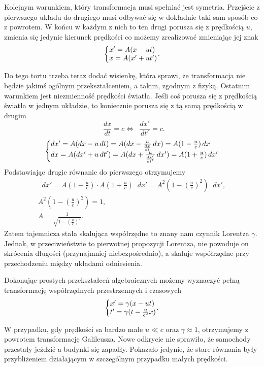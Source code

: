 \documentclass[10pt,twocolumn,fleqn,polish]{article}
\makeatletter
\newcommand{\diff}{\mathop{}\!{d}}
\newcommand{\derivative}[2][]{\mathop{}\!\frac{{d}#1}{{d}#2}}
\newenvironment{eqsystem}
  {\left\lbrace
    \begin{array}{@{}l@{}}}
  {\end{array}\right.}
\makeatother
\begin{document}
Kolejnym warunkiem, który transformacja musi spełniać jest symetria.
Przejście z pierwszego układu do drugiego musi odbywać się w dokładnie taki
sam sposób co z powrotem. W końcu w każdym z nich to ten drugi porusza się
z prędkością $u$, zmienia się jedynie kierunek prędkości co możemy zrealizować
zmieniając jej znak
\[
  \begin{eqsystem}
    x' = A (x - ut) \\
    x = A (x' + ut')
  \end{eqsystem}.
\]

Do tego tortu trzeba teraz dodać wisienkę, która sprawi, że transformacja
nie będzie jakimś ogólnym przekształceniem, a takim, zgodnym z fizyką.
Ostatnim warunkiem jest niezmienność prędkości światła.
Jeśli coś porusza się z prędkością światła w jednym układzie, to koniecznie porusza się
z tą samą prędkością w drugim
\[\derivative[x]{t} = c \iff \derivative[x']{t'} = c.\]
\[
  \begin{eqsystem}
    \diff x' = A (\diff x - u \diff t)
    = A(\diff x - \frac{u}{\derivative[x]{t}} \diff x)
    = A(1 - \frac{u}{c}) \diff x \\
    \diff x = A(\diff x' + u \diff t')
    = A(\diff x + \frac{u}{\derivative[x']{t'}} \diff x')
    = A(1 + \frac{u}{c}) \diff x'
  \end{eqsystem}
\]
Podstawiając drugie równanie do pierwszego otrzymujemy
\begin{gather*}
  \diff x' = A \left(1 - \frac{u}{c}\right) \cdot A \left(1 + \frac{u}{c}\right) \diff x'
  = A^2 \left(1 - \left(\frac{u}{c}\right)^2\right) \diff x',\\
  A^2 \left(1 - \left(\frac{u}{c}\right)^2\right) = 1, \\
  A = \frac{1}{\sqrt{1 - \left(\frac{u}{c}\right)^2}}.
\end{gather*}
Zatem tajemnicza stała skalująca współrzędne to znany nam czynnik
Lorentza $\gamma$.
Jednak, w przeciwieństwie to pierwotnej propozycji Lorentza, nie powoduje
on skrócenia długości (przynajmniej niebezpośrednio), a skaluje współrzędne
przy przechodzeniu między układami odniesienia.

Dokonując prostych przekształceń algebraicznych możemy wyznaczyć pełną transformację
współrzędnych przestrzennych i czasowych
\[
  \begin{eqsystem}
    x' = \gamma (x - ut) \\
    t' = \gamma (t - \frac{u}{c^2}x)
  \end{eqsystem}.
\]

W przypadku, gdy prędkości sa bardzo małe $u \ll c$ oraz $\gamma \approx 1$,
otrzymujemy z powrotem transformację Galileusza. Nowe odkrycie nie sprawiło, że samochody
przestały jeździć a budynki się zapadły. Pokazało jedynie, że stare równania
były przybliżeniem działającym w szczególnym przypadku małych prędkości.
\end{document}
